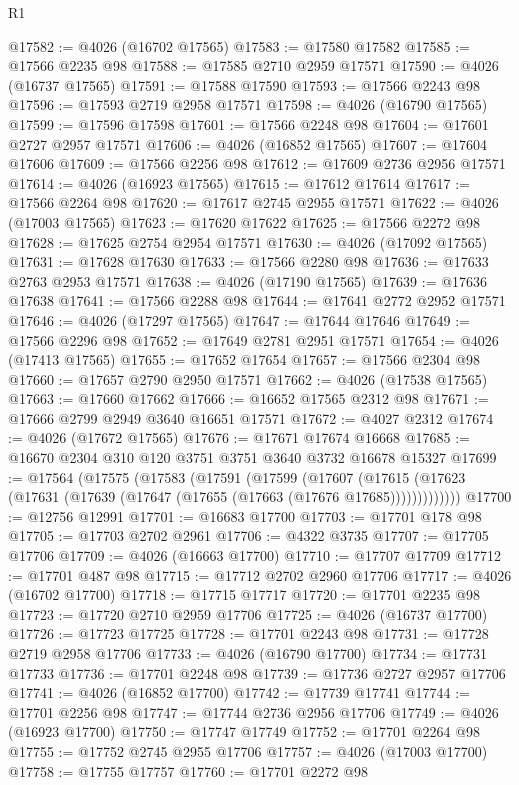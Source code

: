 \begin{lexlean}{R1}
\begin{coremodule}
@17582 := @4026 (@16702 @17565)
@17583 := @17580 @17582
@17585 := @17566 @2235 @98
@17588 := @17585 @2710 @2959 @17571
@17590 := @4026 (@16737 @17565)
@17591 := @17588 @17590
@17593 := @17566 @2243 @98
@17596 := @17593 @2719 @2958 @17571
@17598 := @4026 (@16790 @17565)
@17599 := @17596 @17598
@17601 := @17566 @2248 @98
@17604 := @17601 @2727 @2957 @17571
@17606 := @4026 (@16852 @17565)
@17607 := @17604 @17606
@17609 := @17566 @2256 @98
@17612 := @17609 @2736 @2956 @17571
@17614 := @4026 (@16923 @17565)
@17615 := @17612 @17614
@17617 := @17566 @2264 @98
@17620 := @17617 @2745 @2955 @17571
@17622 := @4026 (@17003 @17565)
@17623 := @17620 @17622
@17625 := @17566 @2272 @98
@17628 := @17625 @2754 @2954 @17571
@17630 := @4026 (@17092 @17565)
@17631 := @17628 @17630
@17633 := @17566 @2280 @98
@17636 := @17633 @2763 @2953 @17571
@17638 := @4026 (@17190 @17565)
@17639 := @17636 @17638
@17641 := @17566 @2288 @98
@17644 := @17641 @2772 @2952 @17571
@17646 := @4026 (@17297 @17565)
@17647 := @17644 @17646
@17649 := @17566 @2296 @98
@17652 := @17649 @2781 @2951 @17571
@17654 := @4026 (@17413 @17565)
@17655 := @17652 @17654
@17657 := @17566 @2304 @98
@17660 := @17657 @2790 @2950 @17571
@17662 := @4026 (@17538 @17565)
@17663 := @17660 @17662
@17666 := @16652 @17565 @2312 @98
@17671 := @17666 @2799 @2949 @3640 @16651 @17571
@17672 := @4027 @2312
@17674 := @4026 (@17672 @17565)
@17676 := @17671 @17674 @16668
@17685 := @16670 @2304 @310 @120 @3751 @3751 @3640 @3732 @16678 @15327
@17699 := @17564
    (@17575
      (@17583
        (@17591
          (@17599
            (@17607
              (@17615 (@17623 (@17631 (@17639 (@17647 (@17655 (@17663 (@17676 @17685)))))))))))))
@17700 := @12756 @12991
@17701 := @16683 @17700
@17703 := @17701 @178 @98
@17705 := @17703 @2702 @2961
@17706 := @4322 @3735
@17707 := @17705 @17706
@17709 := @4026 (@16663 @17700)
@17710 := @17707 @17709
@17712 := @17701 @487 @98
@17715 := @17712 @2702 @2960 @17706
@17717 := @4026 (@16702 @17700)
@17718 := @17715 @17717
@17720 := @17701 @2235 @98
@17723 := @17720 @2710 @2959 @17706
@17725 := @4026 (@16737 @17700)
@17726 := @17723 @17725
@17728 := @17701 @2243 @98
@17731 := @17728 @2719 @2958 @17706
@17733 := @4026 (@16790 @17700)
@17734 := @17731 @17733
@17736 := @17701 @2248 @98
@17739 := @17736 @2727 @2957 @17706
@17741 := @4026 (@16852 @17700)
@17742 := @17739 @17741
@17744 := @17701 @2256 @98
@17747 := @17744 @2736 @2956 @17706
@17749 := @4026 (@16923 @17700)
@17750 := @17747 @17749
@17752 := @17701 @2264 @98
@17755 := @17752 @2745 @2955 @17706
@17757 := @4026 (@17003 @17700)
@17758 := @17755 @17757
@17760 := @17701 @2272 @98

\end{coremodule}
\end{lexlean}
